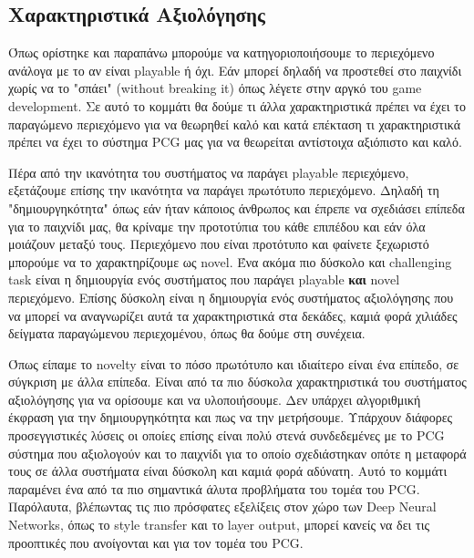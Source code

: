 \subsection{Χαρακτηριστικά Αξιολόγησης}
Όπως ορίστηκε και παραπάνω μπορούμε να κατηγοριοποιήσουμε το περιεχόμενο ανάλογα με το αν είναι playable ή όχι. Εάν μπορεί δηλαδή να προστεθεί στο παιχνίδι χωρίς να το "σπάει" (without breaking it) όπως λέγετε στην αργκό του game development. Σε αυτό το κομμάτι θα δούμε τι άλλα χαρακτηριστικά πρέπει να έχει το παραγώμενο περιεχόμενο για να θεωρηθεί καλό και κατά επέκταση τι χαρακτηριστικά πρέπει να έχει το σύστημα PCG μας για να θεωρείται αντίστοιχα αξιόπιστο και καλό.
\par
Πέρα από την ικανότητα του συστήματος να παράγει playable περιεχόμενο, εξετάζουμε επίσης την ικανότητα να παράγει πρωτότυπο περιεχόμενο. Δηλαδή τη "δημιουργηκότητα" όπως εάν ήταν κάποιος άνθρωπος και έπρεπε να σχεδιάσει επίπεδα για το παιχνίδι μας, θα κρίναμε την προτοτύπια του κάθε επιπέδου και εάν όλα μοιάζουν μεταξύ τους. Περιεχόμενο που είναι προτότυπο και φαίνετε ξεχωριστό μπορούμε να το χαρακτηρίζουμε ως novel. Ένα ακόμα πιο δύσκολο και challenging task είναι η δημιουργία ενός συστήματος που παράγει playable \textbf{και} novel περιεχόμενο. Επίσης δύσκολη είναι η δημιουργία ενός συστήματος αξιολόγησης που να μπορεί να αναγνωρίζει αυτά τα χαρακτηριστικά στα δεκάδες, καμιά φορά χιλιάδες δείγματα παραγώμενου περιεχομένου, όπως θα δούμε στη συνέχεια.
\par
Όπως είπαμε το novelty είναι το πόσο πρωτότυπο και ιδιαίτερο είναι ένα επίπεδο, σε σύγκριση με άλλα επίπεδα. Είναι από τα πιο δύσκολα χαρακτηριστικά του συστήματος αξιολόγησης για να ορίσουμε και να υλοποιήσουμε. Δεν υπάρχει αλγοριθμική έκφραση για την δημιουργηκότητα και πως να την μετρήσουμε. Υπάρχουν διάφορες προσεγγιστικές λύσεις οι οποίες επίσης είναι πολύ στενά συνδεδεμένες με το PCG σύστημα που αξιολογούν και το παιχνίδι για το οποίο σχεδιάστηκαν οπότε η μεταφορά τους σε άλλα συστήματα είναι δύσκολη και καμιά φορά αδύνατη. Αυτό το κομμάτι παραμένει ένα από τα πιο σημαντικά άλυτα προβλήματα του τομέα του PCG. Παρόλαυτα, βλέπωντας τις πιο πρόσφατες εξελίξεις στον χώρο των Deep Neural Networks, όπως το style transfer και το layer output, μπορεί κανείς να δει τις προοπτικές που ανοίγονται και για τον τομέα του PCG.
\par

